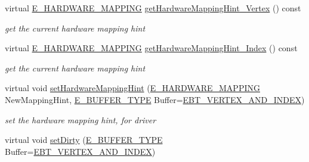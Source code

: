 \begin{DoxyCompactItemize}
virtual \hyperlink{namespaceirr_1_1scene_ac7d8ee8d77da75f2580bb9bb17231c27}{E\+\_\+\+H\+A\+R\+D\+W\+A\+R\+E\+\_\+\+M\+A\+P\+P\+I\+NG} \hyperlink{classirr_1_1scene_1_1CMeshBuffer_adae334e8431e647d837acda0fada8bd5}{get\+Hardware\+Mapping\+Hint\+\_\+\+Vertex} () const
\begin{DoxyCompactList}\small\item\em get the current hardware mapping hint \end{DoxyCompactList}\item 
\mbox{\label{classirr_1_1scene_1_1CMeshBuffer_a3f6eb99f71576b72225ac3eccd68efbe}} 
virtual \hyperlink{namespaceirr_1_1scene_ac7d8ee8d77da75f2580bb9bb17231c27}{E\+\_\+\+H\+A\+R\+D\+W\+A\+R\+E\+\_\+\+M\+A\+P\+P\+I\+NG} \hyperlink{classirr_1_1scene_1_1CMeshBuffer_a3f6eb99f71576b72225ac3eccd68efbe}{get\+Hardware\+Mapping\+Hint\+\_\+\+Index} () const
\begin{DoxyCompactList}\small\item\em get the current hardware mapping hint \end{DoxyCompactList}\item 
\mbox{\label{classirr_1_1scene_1_1CMeshBuffer_aa86cd9ffbe81c9f86a6096b2e5d3410e}} 
virtual void \hyperlink{classirr_1_1scene_1_1CMeshBuffer_aa86cd9ffbe81c9f86a6096b2e5d3410e}{set\+Hardware\+Mapping\+Hint} (\hyperlink{namespaceirr_1_1scene_ac7d8ee8d77da75f2580bb9bb17231c27}{E\+\_\+\+H\+A\+R\+D\+W\+A\+R\+E\+\_\+\+M\+A\+P\+P\+I\+NG} New\+Mapping\+Hint, \hyperlink{namespaceirr_1_1scene_a8f59a89ffef0ad8e5b2c2cb874a93e8c}{E\+\_\+\+B\+U\+F\+F\+E\+R\+\_\+\+T\+Y\+PE} Buffer=\hyperlink{namespaceirr_1_1scene_a8f59a89ffef0ad8e5b2c2cb874a93e8ca34ea664123fbc28610408e51b014dcdd}{E\+B\+T\+\_\+\+V\+E\+R\+T\+E\+X\+\_\+\+A\+N\+D\+\_\+\+I\+N\+D\+EX})
\begin{DoxyCompactList}\small\item\em set the hardware mapping hint, for driver \end{DoxyCompactList}\item 
\mbox{\label{classirr_1_1scene_1_1CMeshBuffer_a7afead32226650c724f13f6f61282810}} 
virtual void \hyperlink{classirr_1_1scene_1_1CMeshBuffer_a7afead32226650c724f13f6f61282810}{set\+Dirty} (\hyperlink{namespaceirr_1_1scene_a8f59a89ffef0ad8e5b2c2cb874a93e8c}{E\+\_\+\+B\+U\+F\+F\+E\+R\+\_\+\+T\+Y\+PE} Buffer=\hyperlink{namespaceirr_1_1scene_a8f59a89ffef0ad8e5b2c2cb874a93e8ca34ea664123fbc28610408e51b014dcdd}{E\+B\+T\+\_\+\+V\+E\+R\+T\+E\+X\+\_\+\+A\+N\+D\+\_\+\+I\+N\+D\+EX})

\end{DoxyCompactItemize}
